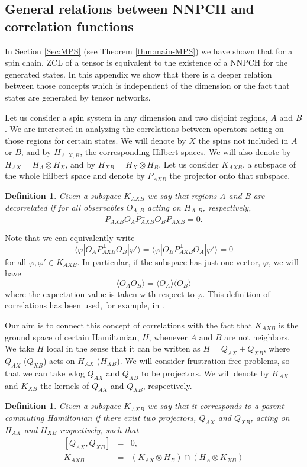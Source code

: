 \documentclass{elsarticle}
\newcommand{\be}{\begin{equation}}
\newcommand{\ee}{\end{equation}}
\newcommand{\bea}{\begin{eqnarray}}
\newcommand{\eea}{\end{eqnarray}}
\newtheorem{defn}[thm]{Definition}
\begin{document}
\subsection{General relations between NNPCH and correlation functions}

In Section \ref{Sec:MPS} (see Theorem \ref{thm:main-MPS}) we have shown that for a spin chain, ZCL of a tensor is equivalent to the existence of a NNPCH for the generated states. In this appendix we show that there is a deeper relation between those concepts which is independent of the dimension or the fact that states are generated by tensor networks.

Let us consider a spin system in any dimension and two disjoint regions, $A$ and $B$. We are interested in analyzing the correlations between operators acting on those regions for certain states. We will denote by $X$ the spins not included in $A$ or $B$, and by $H_{A,X,B}$, the corresponding Hilbert spaces. We will also denote by $H_{AX}=H_A\otimes H_X$, and by $H_{XB}=H_X\otimes H_B$. Let us consider $K_{AXB}$, a  subspace of the whole Hilbert space and denote by $P_{AXB}$ the projector onto that subspace.

\begin{defn}
Given a subspace $K_{AXB}$ we say that regions A and B are decorrelated if for all observables $O_{A,B}$ acting on $H_{A,B}$, respectively,
 \be
 P_{AXB} O_A P_{AXB}^\perp O_B P_{AXB}=0.
 \ee
\end{defn}

Note that we can equivalently write
 \be
 \label{decorr}
 \langle \varphi|O_A P_{AXB}^\perp O_B|\varphi'\rangle=\langle \varphi|O_B P_{AXB}^\perp O_A|\varphi'\rangle=0
 \ee
for all $\varphi,\varphi'\in K_{AXB}$. In particular, if the subspace has just one vector, $\varphi$, we will have
 \be
 \langle O_A O_B\rangle=\langle O_A\rangle \langle O_B \rangle
 \ee
where the expectation value is taken with respect to $\varphi$. This definition of correlations has been used, for example, in \cite{Hastingsdefcorr}. 

Our aim is to connect this concept of correlations with the fact that $K_{AXB}$ is the ground space of certain Hamiltonian, $H$, whenever $A$ and $B$ are not neighbors. We take $H$ local in the sense that it can be written as $H=Q_{AX} + Q_{XB}$, where $Q_{AX}$ ($Q_{XB}$) acts on $H_{AX}$ ($H_{XB}$). We will consider frustration-free problems, so that we can take wlog $Q_{AX}$ and $Q_{XB}$ to be projectors. We will denote by $K_{AX}$ and $K_{XB}$ the kernels of $Q_{AX}$ and $Q_{XB}$, respectively. 
\begin{defn}
Given a subspace $K_{AXB}$ we say that it corresponds to a parent commuting Hamiltonian if there exist two projectors, $Q_{AX}$ and $Q_{XB}$, acting on $H_{AX}$ and $H_{XB}$ respectively, such that
 \begin{subequations}
 \bea
 \label{QAXQXB}
 [Q_{AX},Q_{XB}]&=& 0,\\
 \label{KAXBKAXKXB}
 K_{AXB} &=& \left(K_{AX}\otimes H_B \right)\cap\left( H_A\otimes K_{XB}\right)
 \eea
 \end{subequations}
\end{defn}
\end{document}
